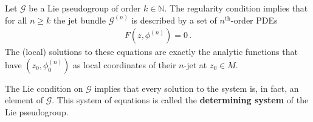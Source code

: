     \begin{property}
        Let $\mathcal{G}$ be a Lie pseudogroup of order $k\in\mathbb{N}$. The regularity condition implies that for all $n\geq k$ the jet bundle $\mathcal{G}^{(n)}$ is described by a set of $n^{\text{th}}$-order PDEs
        \begin{gather}
            F\left(z,\phi^{(n)}\right) = 0\,.
        \end{gather}
        The (local) solutions to these equations are exactly the analytic functions that have $(z_0,\phi^{(n)}_0)$ as local coordinates of their $n$-jet at $z_0\in M$.

        The Lie condition on $\mathcal{G}$ implies that every solution to the system is, in fact, an element of $\mathcal{G}$. This system of equations is called the \textbf{determining system} of the Lie pseudogroup.
    \end{property}


